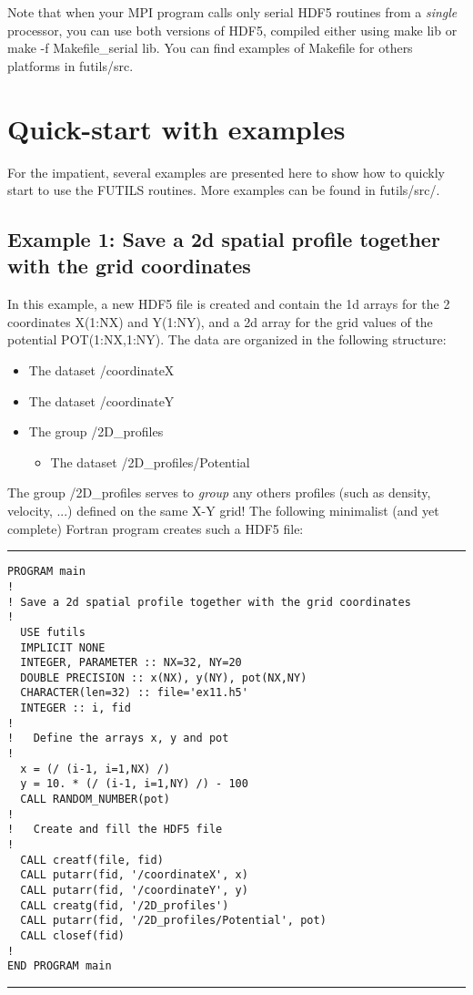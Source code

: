 \documentclass[a4paper]{article}
\begin{document}
Note that when your MPI program calls only serial HDF5
routines from a {\itshape single\/} processor, you can use both versions of HDF5,
compiled either using {\ttfamily make lib} or {\ttfamily make -f Makefile\_serial lib}.
You can find examples of {\ttfamily Makefile} for others platforms in
{\ttfamily futils/src}.




\section{Quick-start with examples}

For the impatient, several examples are presented here to show how to quickly
start to
use the FUTILS routines. More examples can be found in {\ttfamily futils/src/}.


\subsection{Example 1: Save a 2d spatial profile together with the grid coordinates}

In this example, a new HDF5 file is created and contain the
1d arrays for the 2 coordinates X(1:NX) and Y(1:NY), and a 2d array for the grid
values of the potential POT(1:NX,1:NY). The data are organized in the following
structure:
\begin{itemize}
\item  The dataset {\ttfamily /coordinateX}
\item  The dataset {\ttfamily /coordinateY}
\item  The group   {\ttfamily /2D\_profiles}
\begin{itemize}
\item   The dataset {\ttfamily /2D\_profiles/Potential}
\end{itemize}
\end{itemize}

The group {\ttfamily /2D\_profiles} serves to {\itshape group\/} any others profiles
(such as density, velocity, ...) defined on the same X-Y grid! The following
minimalist (and yet complete) Fortran program  creates such a HDF5 file:
\par
\addvspace{\medskipamount}
\nopagebreak\hrule
\begin{verbatim}
PROGRAM main
!
! Save a 2d spatial profile together with the grid coordinates
!
  USE futils
  IMPLICIT NONE
  INTEGER, PARAMETER :: NX=32, NY=20
  DOUBLE PRECISION :: x(NX), y(NY), pot(NX,NY)
  CHARACTER(len=32) :: file='ex11.h5'
  INTEGER :: i, fid
!
!   Define the arrays x, y and pot
!
  x = (/ (i-1, i=1,NX) /)
  y = 10. * (/ (i-1, i=1,NY) /) - 100
  CALL RANDOM_NUMBER(pot)
!
!   Create and fill the HDF5 file
!
  CALL creatf(file, fid)
  CALL putarr(fid, '/coordinateX', x)
  CALL putarr(fid, '/coordinateY', y)
  CALL creatg(fid, '/2D_profiles')
  CALL putarr(fid, '/2D_profiles/Potential', pot)
  CALL closef(fid)
!
END PROGRAM main
\end{verbatim}
\nopagebreak\hrule
\addvspace{\medskipamount}
\end{document}
